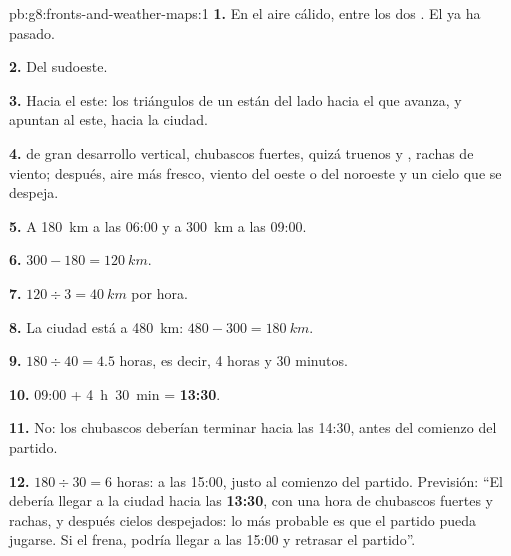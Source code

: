 \begin{solution}{pb:g8:fronts-and-weather-maps:1}
\textbf{1.} En el aire cálido, entre los dos . El  ya
ha pasado.

\textbf{2.} Del sudoeste.

\textbf{3.} Hacia el este: los triángulos de un  están del lado
hacia el que avanza, y apuntan al este, hacia la ciudad.

\textbf{4.}  de gran desarrollo vertical, chubascos fuertes, quizá
truenos y , rachas de viento; después, aire más fresco, viento del
oeste o del noroeste y un cielo que se despeja.

\textbf{5.} A \qty{180}{km} a las 06:00 y a \qty{300}{km} a las 09:00.

\textbf{6.} $300 - 180 = \qty{120}{km}$.

\textbf{7.} $120 \div 3 = \qty{40}{km}$ por hora.

\textbf{8.} La ciudad está a \qty{480}{km}: $480 - 300 = \qty{180}{km}$.

\textbf{9.} $180 \div 40 = 4.5$ horas, es decir, 4 horas y 30 minutos.

\textbf{10.} 09:00 + 4~h~30~min = \textbf{13:30}.

\textbf{11.} No: los chubascos deberían terminar hacia las 14:30, antes del
comienzo del partido.

\textbf{12.} $180 \div 30 = 6$ horas: a las 15:00, justo al comienzo del
partido. Previsión: ``El  debería llegar a la ciudad hacia las
\textbf{13:30}, con una hora de chubascos fuertes y rachas, y después
cielos despejados: lo más probable es que el partido pueda jugarse. Si el
 frena, podría llegar a las 15:00 y retrasar el partido''.
\end{solution}
